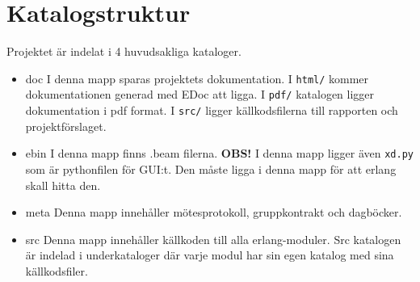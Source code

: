 
\chapter{Katalogstruktur}

\label{Katalogstruktur} 



Projektet är indelat i 4 huvudsakliga kataloger.

\begin{itemize}

\item doc     I denna mapp sparas projektets dokumentation. I \verb+html/+ kommer dokumentationen generad med EDoc att ligga. I \verb+pdf/+ katalogen ligger dokumentation i pdf format. I \verb+src/+ ligger källkodsfilerna till rapporten och projektförslaget.

\item ebin      I denna mapp finns .beam filerna. \textbf{OBS!} I denna mapp ligger även \verb+xd.py+ som är pythonfilen för GUI:t. Den måste ligga i denna mapp för att erlang skall hitta den.

\item meta    Denna mapp innehåller mötesprotokoll, gruppkontrakt och dagböcker.

\item src     Denna mapp innehåller källkoden till alla erlang-moduler. Src katalogen är indelad i underkataloger där varje modul har sin egen katalog med sina källkodsfiler.

\end{itemize}

